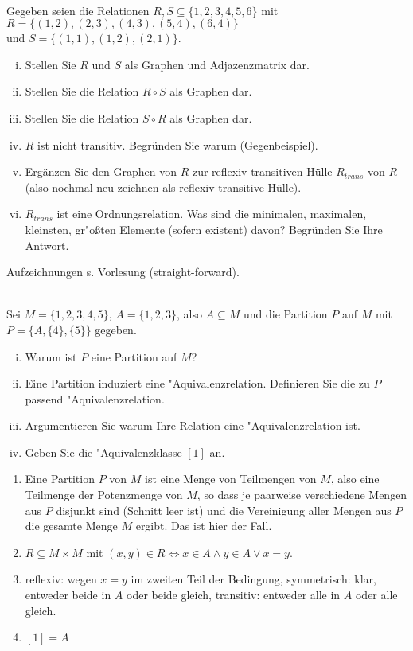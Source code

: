 \\
Gegeben seien die Relationen $R,S\subseteq\{1,2,3,4,5,6\}$ mit $R=\{(1,2),(2,3),(4,3),(5,4),(6,4)\}$\\und $S=\{(1,1),(1,2),(2,1)\}$.
\begin{enumerate}[(i)]
    \item Stellen Sie $R$ und $S$ als Graphen und Adjazenzmatrix dar.
    \item Stellen Sie die Relation $R\circ S$ als Graphen dar.
    \item Stellen Sie die Relation $S\circ R$ als Graphen dar.
    \item $R$ ist nicht transitiv. Begründen Sie warum (Gegenbeispiel).
    \item Ergänzen Sie den Graphen von $R$ zur reflexiv-transitiven Hülle $R_{trans}$ von $R$ (also nochmal neu zeichnen als reflexiv-transitive Hülle).
    \item $R_{trans}$ ist eine Ordnungsrelation. Was sind die minimalen, maximalen, kleinsten, gr"o{\ss}ten Elemente (sofern existent) davon? Begründen Sie Ihre Antwort.

\end{enumerate}

\begin{loesung}
Aufzeichnungen s. Vorlesung (straight-forward).
\end{loesung}


\\
Sei $M=\{1,2,3,4,5\}$, $A=\{1,2,3\}$, also $A\subseteq M$ und die Partition $P$ auf $M$ mit $P=\{A, \{4\}, \{5\}\}$ gegeben.
\begin{enumerate}[(i)]
    \item Warum ist $P$ eine Partition auf $M$? 
    \item Eine Partition induziert eine "Aquivalenzrelation. Definieren Sie die zu $P$ passend "Aquivalenzrelation.
    \item Argumentieren Sie warum Ihre Relation eine "Aquivalenzrelation ist.
    \item Geben Sie die "Aquivalenzklasse $[1]$ an.
\end{enumerate}
\begin{loesung}
\begin{enumerate}

\item Eine Partition $P$ von $M$ ist eine Menge von Teilmengen von $M$, also eine Teilmenge der Potenzmenge von $M$, so dass je paarweise verschiedene Mengen aus $P$ disjunkt sind (Schnitt leer ist) und die Vereinigung aller Mengen aus $P$ die gesamte Menge $M$ ergibt. Das ist hier der Fall.
\item $R\subseteq M\times M$ mit $(x,y)\in R \Leftrightarrow x\in A \wedge y\in A \vee x=y$.
\item reflexiv: wegen $x=y$ im zweiten Teil der Bedingung, symmetrisch: klar, entweder beide in $A$ oder beide gleich, transitiv: entweder alle in $A$ oder alle gleich.
\item $[1]=A$
\end{enumerate} 
\end{loesung}


